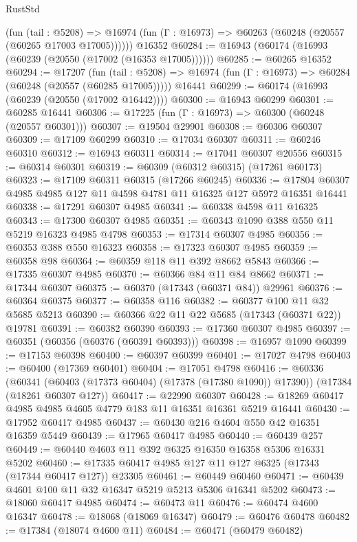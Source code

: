 \begin{lexlean}{RustStd}
\begin{coremodule}
      (fun (tail : @5208) =>
      @16974 (fun (Γ : @16973) => @60263 (@60248 (@20557 (@60265 @17003 @17005))))))
    @16352
@60284 := @16943 (@60174 (@16993 (@60239 (@20550 (@17002 (@16353 @17005))))))
@60285 := @60265 @16352
@60294 := @17207
    (fun (tail : @5208) => @16974 (fun (Γ : @16973) => @60284 (@60248 (@20557 (@60285 @17005)))))
    @16441
@60299 := @60174 (@16993 (@60239 (@20550 (@17002 @16442))))
@60300 := @16943 @60299
@60301 := @60285 @16441
@60306 := @17225 (fun (Γ : @16973) => @60300 (@60248 (@20557 @60301)))
@60307 := @19504 @29901
@60308 := @60306 @60307
@60309 := @17109 @60299
@60310 := @17034 @60307
@60311 := @60246 @60310
@60312 := @16943 @60311
@60314 := @17041 @60307 @20556
@60315 := @60314 @60301
@60319 := @60309 (@60312 @60315) (@17261 @60173)
@60323 := @17109 @60311 @60315 (@17266 @60245)
@60336 := @17804 @60307 @4985 @4985 @127 @11 @4598 @4781 @11 @16325 @127 @5972 @16351 @16441
@60338 := @17291 @60307 @4985
@60341 := @60338 @4598 @11 @16325
@60343 := @17300 @60307 @4985
@60351 := @60343 @1090 @388 @550 @11 @5219 @16323 @4985 @4798
@60353 := @17314 @60307 @4985
@60356 := @60353 @388 @550 @16323
@60358 := @17323 @60307 @4985
@60359 := @60358 @98
@60364 := @60359 @118 @11 @392 @8662 @5843
@60366 := @17335 @60307 @4985
@60370 := @60366 @84 @11 @84 @8662
@60371 := @17344 @60307
@60375 := @60370 (@17343 (@60371 @84)) @29961
@60376 := @60364 @60375
@60377 := @60358 @116
@60382 := @60377 @100 @11 @32 @5685 @5213
@60390 := @60366 @22 @11 @22 @5685 (@17343 (@60371 @22)) @19781
@60391 := @60382 @60390
@60393 := @17360 @60307 @4985
@60397 := @60351 (@60356 (@60376 (@60391 @60393)))
@60398 := @16957 @1090
@60399 := @17153 @60398
@60400 := @60397 @60399
@60401 := @17027 @4798
@60403 := @60400 (@17369 @60401)
@60404 := @17051 @4798
@60416 := @60336
    (@60341 (@60403 (@17373 @60404) (@17378 (@17380 @1090)) @17390))
    (@17384 (@18261 @60307 @127))
@60417 := @22990 @60307
@60428 := @18269 @60417 @4985 @4985 @4605 @4779 @183 @11 @16351 @16361 @5219 @16441
@60430 := @17952 @60417 @4985
@60437 := @60430 @216 @4604 @550 @42 @16351 @16359 @5449
@60439 := @17965 @60417 @4985
@60440 := @60439 @257
@60449 := @60440 @4603 @11 @392 @6325 @16350 @16358 @5306 @16331 @5202
@60460 := @17335 @60417 @4985 @127 @11 @127 @6325 (@17343 (@17344 @60417 @127)) @23305
@60461 := @60449 @60460
@60471 := @60439 @4601 @100 @11 @32 @16347 @5219 @5213 @5306 @16341 @5202
@60473 := @18060 @60417 @4985
@60474 := @60473 @11
@60476 := @60474 @4600 @16347
@60478 := @18068 (@18069 @16347)
@60479 := @60476 @60478
@60482 := @17384 (@18074 @4600 @11)
@60484 := @60471 (@60479 @60482)

\end{coremodule}
\end{lexlean}
